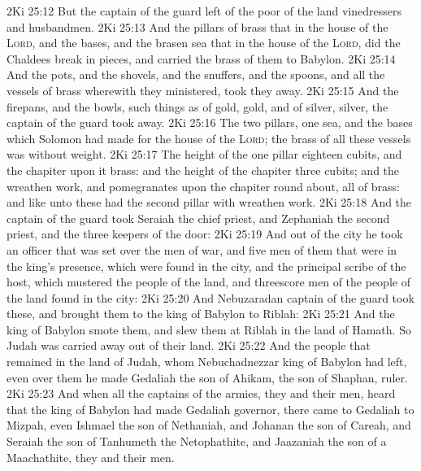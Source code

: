 \vs 2Ki 25:12 But the captain of the guard left of the poor of the land  vinedressers and husbandmen.
\vs 2Ki 25:13 And the pillars of brass that  in the house of the \textsc{Lord}, and the bases, and the brasen sea that  in the house of the \textsc{Lord}, did the Chaldees break in pieces, and carried the brass of them to Babylon.
\vs 2Ki 25:14 And the pots, and the shovels, and the snuffers, and the spoons, and all the vessels of brass wherewith they ministered, took they away.
\vs 2Ki 25:15 And the firepans, and the bowls,  such things as  of gold,  gold, and of silver,  silver, the captain of the guard took away.
\vs 2Ki 25:16 The two pillars, one sea, and the bases which Solomon had made for the house of the \textsc{Lord}; the brass of all these vessels was without weight.
\vs 2Ki 25:17 The height of the one pillar  eighteen cubits, and the chapiter upon it  brass: and the height of the chapiter three cubits; and the wreathen work, and pomegranates upon the chapiter round about, all of brass: and like unto these had the second pillar with wreathen work.
\vs 2Ki 25:18 And the captain of the guard took Seraiah the chief priest, and Zephaniah the second priest, and the three keepers of the door:
\vs 2Ki 25:19 And out of the city he took an officer that was set over the men of war, and five men of them that were in the king's presence, which were found in the city, and the principal scribe of the host, which mustered the people of the land, and threescore men of the people of the land  found in the city:
\vs 2Ki 25:20 And Nebuzaradan captain of the guard took these, and brought them to the king of Babylon to Riblah:
\vs 2Ki 25:21 And the king of Babylon smote them, and slew them at Riblah in the land of Hamath. So Judah was carried away out of their land.
\vs 2Ki 25:22 And  the people that remained in the land of Judah, whom Nebuchadnezzar king of Babylon had left, even over them he made Gedaliah the son of Ahikam, the son of Shaphan, ruler.
\vs 2Ki 25:23 And when all the captains of the armies, they and their men, heard that the king of Babylon had made Gedaliah governor, there came to Gedaliah to Mizpah, even Ishmael the son of Nethaniah, and Johanan the son of Careah, and Seraiah the son of Tanhumeth the Netophathite, and Jaazaniah the son of a Maachathite, they and their men.
